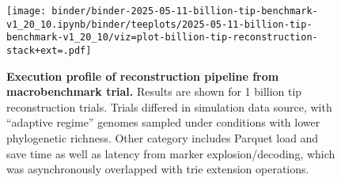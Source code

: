 \begin{figure}[h]
\centering
\texttt{[image: binder/binder-2025-05-11-billion-tip-benchmark-v1\_20\_10.ipynb/binder/teeplots/2025-05-11-billion-tip-benchmark-v1\_20\_10/viz=plot-billion-tip-reconstruction-stack+ext=.pdf]}
\vspace{-1em}
\caption{%
\textbf{Execution profile of reconstruction pipeline from macrobenchmark trial.}
\small
Results are shown for 1 billion tip reconstruction trials.
Trials differed in simulation data source, with ``adaptive regime'' genomes sampled under conditions with lower phylogenetic richness.
Other category includes Parquet load and save time as well as latency from marker explosion/decoding, which was asynchronously overlapped with trie extension operations.
}
\label{fig:billion-tip-time}
\vspace{-1.5em}
\end{figure}